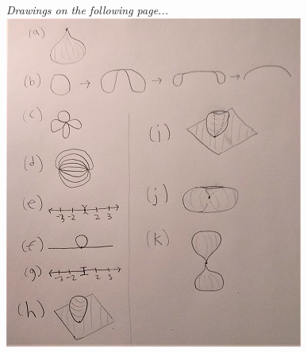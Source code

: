 \documentclass[12pt]{article}
\begin{document}
  \newline
  \textit{Drawings on the following page...}
  \newpage
  \includegraphics{IMG318_2}
\end{document}
